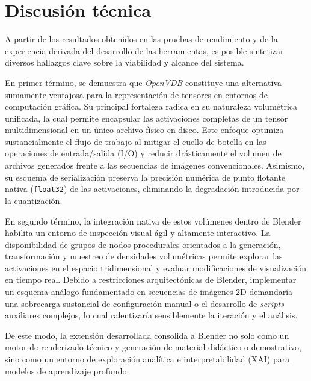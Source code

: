 \section{Discusión técnica}
A partir de los resultados obtenidos en las pruebas de rendimiento y de la experiencia derivada del desarrollo de las herramientas, 
es posible sintetizar diversos hallazgos clave sobre la viabilidad y alcance del sistema.
\medskip

En primer término, se demuestra que \textit{OpenVDB} constituye una alternativa sumamente ventajosa para la representación de tensores 
en entornos de computación gráfica. Su principal fortaleza radica en su naturaleza volumétrica unificada, la cual permite encapsular las 
activaciones completas de un tensor multidimensional en un único archivo físico en disco. Este enfoque optimiza sustancialmente el flujo 
de trabajo al mitigar el cuello de botella en las operaciones de entrada/salida (I/O) y reducir drásticamente el volumen de archivos 
generados frente a las secuencias de imágenes convencionales. Asimismo, su esquema de serialización preserva la precisión numérica de 
punto flotante nativa (\texttt{float32}) de las activaciones, eliminando la degradación introducida por la cuantización.
\medskip

En segundo término, la integración nativa de estos volúmenes dentro de Blender habilita un entorno de inspección visual ágil y altamente 
interactivo. La disponibilidad de grupos de nodos procedurales orientados a la generación, transformación y muestreo de densidades 
volumétricas permite explorar las activaciones en el espacio tridimensional y evaluar modificaciones de visualización en tiempo real. 
Debido a restricciones arquitectónicas de Blender, implementar un esquema análogo fundamentado en secuencias de imágenes 2D demandaría 
una sobrecarga sustancial de configuración manual o el desarrollo de \textit{scripts} auxiliares complejos, lo cual ralentizaría sensiblemente 
la iteración y el análisis.
\medskip

De este modo, la extensión desarrollada consolida a Blender no solo como un motor de renderizado técnico y generación de material didáctico o 
demostrativo, sino como un entorno de exploración analítica e interpretabilidad (XAI) para modelos de aprendizaje profundo.
\medskip

